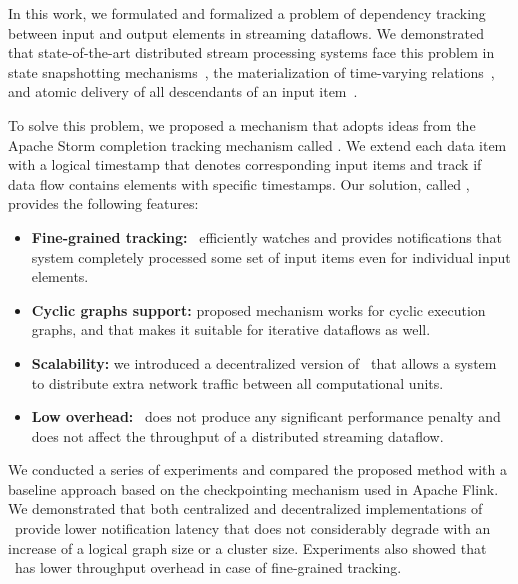 \label {fs-acker-conclusion}

In this work, we formulated and formalized a problem of dependency tracking between input and output elements in streaming dataflows. We demonstrated that state-of-the-art distributed stream processing systems face this problem in state snapshotting mechanisms~\cite{Carbone:2017:SMA:3137765.3137777, apache:storm}, the materialization of time-varying relations~\cite{Begoli:2019:OSR:3299869.3314040}, and atomic delivery of all descendants of an input item~\cite{we2018adbis}.  

To solve this problem, we proposed a mechanism that adopts ideas from the Apache Storm completion tracking mechanism called \acker. We extend each data item with a logical timestamp that denotes corresponding input items and track if data flow contains elements with specific timestamps. Our solution, called \tracker, provides the following features:
\begin{itemize}
    \item {\bf Fine-grained tracking:} \tracker\ efficiently watches and provides notifications that system completely processed some set of input items even for individual input elements.
    \item {\bf Cyclic graphs support:} proposed mechanism works for cyclic execution graphs, and that makes it suitable for iterative dataflows as well. 
    \item {\bf Scalability:} we introduced a decentralized version of \tracker\ that allows a system to distribute extra network traffic between all computational units. 
    \item {\bf Low overhead:} \tracker\ does not produce any significant performance penalty and does not affect the throughput of a distributed streaming dataflow.
\end{itemize}

We conducted a series of experiments and compared the proposed method with a baseline approach based on the checkpointing mechanism used in Apache Flink. We demonstrated that both centralized and decentralized implementations of \tracker\ provide lower notification latency that does not considerably degrade with an increase of a logical graph size or a cluster size. Experiments also showed that \tracker\ has lower throughput overhead in case of fine-grained tracking.